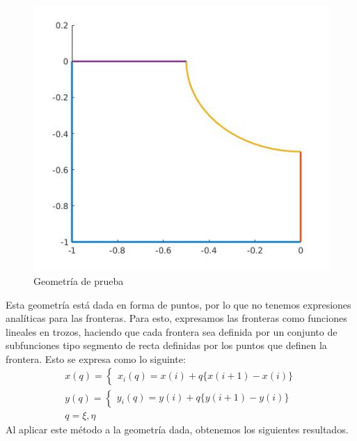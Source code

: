 \documentclass{article}
\begin{document}
\begin{enumerate}
\begin{itemize}
\begin{itemize}
\begin{figure}[H]
			\includegraphics[scale=0.5]{./imgs/img_geometry_boundaries.jpg}
			\caption{Geometr\'ia de prueba}
			\label{fig:img_geometry_boundary}
		\end{figure}
		Esta geometr\'ia est\'a dada en forma de puntos, por lo que no tenemos expresiones anal\'iticas para las fronteras.
		Para esto, expresamos las fronteras como funciones lineales en trozos, haciendo que cada frontera sea definida por un conjunto de subfunciones tipo segmento de recta definidas por los puntos que definen la frontera. Esto se expresa como lo siguinte:
		\begin{gather*}
			x(q) = 
			\begin{cases}
				x_{i}(q) = x(i) + q \lbrace x(i + 1) - x(i) \rbrace
			\end{cases}
			\\
			y(q) = 
			\begin{cases}
				y_{i}(q) = y(i) + q \lbrace y(i + 1) - y(i) \rbrace
			\end{cases}
			\\
			q = {\xi, \eta}
		\end{gather*}
		Al aplicar este m\'etodo a la geometr\'ia dada, obtenemos los siguientes resultados.
		\begin{figure}[H]
			\centering

\end{figure}
\end{itemize}
\end{itemize}
\end{enumerate}
\end{document}
